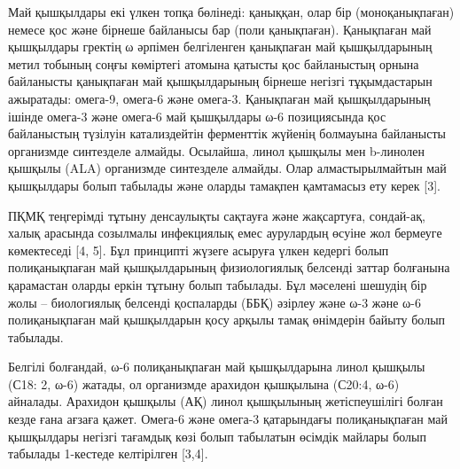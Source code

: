 \begin{multicols}{2}
Май қышқылдары екі үлкен топқа бөлінеді: қаныққан, олар бір
(моноқанықпаған) немесе қос және бірнеше байланысы бар (поли
қанықпаған). Қанықпаған май қышқылдары гректің ω әрпімен белгіленген
қанықпаған май қышқылдарының метил тобының соңғы көміртегі атомына
қатысты қос байланыстың орнына байланысты қанықпаған май қышқылдарының
бірнеше негізгі тұқымдастарын ажыратады: омега-9, омега-6 және омега-3.
Қанықпаған май қышқылдарының ішінде омега-3 және омега-6 май қышқылдары
ω-6 позициясында қос байланыстың түзілуін катализдейтін ферменттік
жүйенің болмауына байланысты организмде синтезделе алмайды. Осылайша,
линол қышқылы мен b-линолен қышқылы (ALA) организмде синтезделе алмайды.
Олар алмастырылмайтын май қышқылдары болып табылады және оларды тамақпен
қамтамасыз ету керек {[}3{]}.

ПҚМҚ теңгерімді тұтыну денсаулықты сақтауға және жақсартуға, сондай-ақ,
халық арасында созылмалы инфекциялық емес аурулардың өсуіне жол бермеуге
көмектеседі {[}4, 5{]}. Бұл принципті жүзеге асыруға үлкен кедергі болып
полиқанықпаған май қышқылдарының физиологиялық белсенді заттар болғанына
қарамастан оларды еркін тұтыну болып табылады. Бұл мәселені шешудің бір
жолы -- биологиялық белсенді қоспаларды (ББҚ) әзірлеу және ω-3 және ω-6
полиқанықпаған май қышқылдарын қосу арқылы тамақ өнімдерін байыту болып
табылады.

Белгілі болғандай, ω-6 полиқанықпаған май қышқылдарына линол қышқылы
(С18: 2, ω-6) жатады, ол организмде арахидон қышқылына (С20:4, ω-6)
айналады. Арахидон қышқылы (АҚ) линол қышқылының жетіспеушілігі болған
кезде ғана ағзаға қажет. Омега-6 және омега-3 қатарындағы полиқанықпаған
май қышқылдары негізгі тағамдық көзі болып табылатын өсімдік майлары
болып табылады 1-кестеде келтірілген {[}3,4{]}.
\end{multicols}

